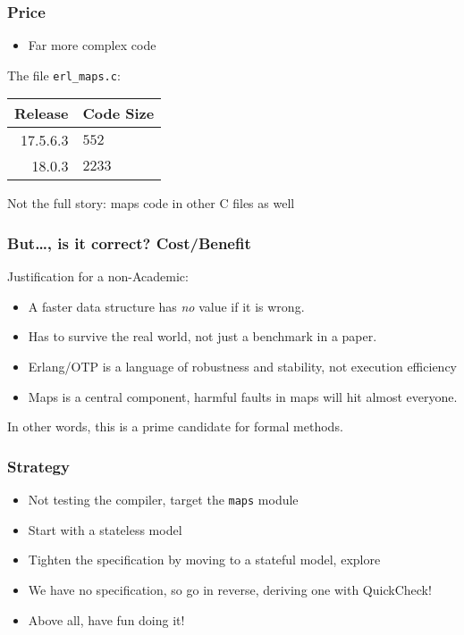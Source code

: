 \documentclass[lualatex]{beamer}
\begin{document}
\begin{frame}[fragile]
\frametitle{Price}
\begin{itemize}
\item Far more complex code
\end{itemize}

The file \texttt{erl\_maps.c}:\\
\begin{center}
\begin{tabular}[c]{r|l}
Release&Code Size\\
\hline
17.5.6.3 & $552$ \\
18.0.3 & $2233$ \\
\end{tabular}
\end{center}
Not the full story: maps code in other C files as well
\end{frame}

\begin{frame}
\frametitle{But…, is it correct? Cost/Benefit}
Justification for a non-Academic:
\begin{itemize}
\item A faster data structure has \emph{no} value if it is wrong.
\item Has to survive the real world, not just a benchmark in a paper.
\item Erlang/OTP is a language of robustness and stability, not execution efficiency
\item Maps is a central component, harmful faults in maps will hit almost everyone.
\end{itemize}

In other words, this is a prime candidate for formal methods.
\end{frame}

\begin{frame}
\frametitle{Strategy}
\begin{itemize}
\item Not testing the compiler, target the \texttt{maps} module
\item Start with a stateless model
\item Tighten the specification by moving to a stateful model, explore
\item We have no specification, so go in reverse, deriving one with QuickCheck!
\item Above all, have fun doing it!
\end{itemize}
\end{frame}
\end{document}
